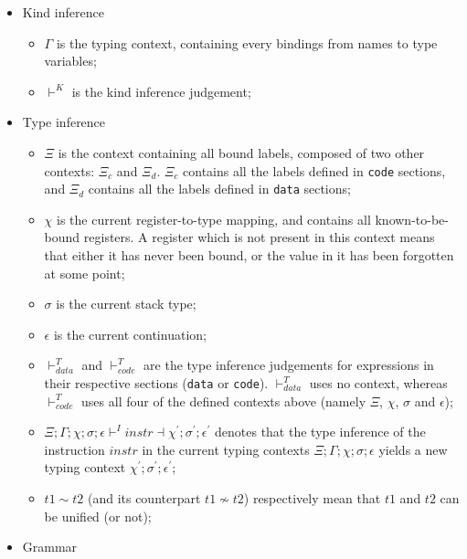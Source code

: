 \begin{itemize}
  \item Kind inference
        \begin{itemize}
          \item $\Gamma$ is the typing context, containing every bindings from names to type variables;
          \item $\vdash^{K}$ is the kind inference judgement;
        \end{itemize}
  \item Type inference
        \begin{itemize}
          \item $\Xi$ is the context containing all bound labels, composed of two other contexts: $\Xi_{c}$ and $\Xi_{d}$. $\Xi_{c}$ contains all the labels defined in \texttt{code} sections, and $\Xi_{d}$ contains all the labels defined in \texttt{data} sections;
          \item $\chi$ is the current register-to-type mapping, and contains all known-to-be-bound registers.
                A register which is not present in this context means that either it has never been bound, or the value in it has been forgotten at some point;
          \item $\sigma$ is the current stack type;
          \item $\epsilon$ is the current continuation;
          \item $\vdash^{T}_{data}$ and $\vdash^{T}_{code}$ are the type inference judgements for expressions in their respective sections (\texttt{data} or \texttt{code}).
                $\vdash^{T}_{data}$ uses no context, whereas $\vdash^{T}_{code}$ uses all four of the defined contexts above (namely $\Xi$, $\chi$, $\sigma$ and $\epsilon$);
          \item $\Xi;\Gamma;\chi;\sigma;\epsilon\vdash^{I}instr\dashv\chi^\prime;\sigma^\prime;\epsilon^\prime$ denotes that the type inference of the instruction $instr$ in the current typing contexts $\Xi;\Gamma;\chi;\sigma;\epsilon$ yields a new typing context $\chi^\prime;\sigma^\prime;\epsilon^\prime$;
          \item $t1 \sim t2$ (and its counterpart $t1 \nsim t2$) respectively mean that $t1$ and $t2$ can be unified (or not);
        \end{itemize}
  \item Grammar
        \begin{figure}[H]
          \centering
\end{figure}
\end{itemize}
